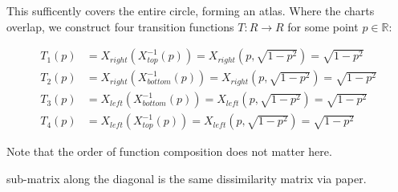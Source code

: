 \documentclass{article}
\begin{document}
        This sufficently covers the entire circle, forming an atlas. Where the charts overlap, we construct four transition functions $T: R \rightarrow R$ for some point $p \in \mathbb{R}$:

        \begin{align*}
            T_1(p) &= X_{right} (X_{top}^{-1}(p)) = X_{right} (p, \sqrt{1 - p^2}) =  \sqrt{1 - p^2} \\
            T_2(p) &= X_{right} (X_{bottom}^{-1}(p)) = X_{right} (p, \sqrt{1 - p^2}) =  \sqrt{1 - p^2} \\
            T_3(p) &= X_{left} (X_{bottom}^{-1}(p)) = X_{left}(p, \sqrt{1 - p^2}) = \sqrt{1 - p^2} \\
            T_4(p) &= X_{left} (X_{top}^{-1}(p)) = X_{left}(p, \sqrt{1 - p^2}) = \sqrt{1 - p^2}
        \end{align*}

        Note that the order of function composition does not matter here.


sub-matrix along the diagonal is the same dissimilarity matrix via paper. 
\end{document}
